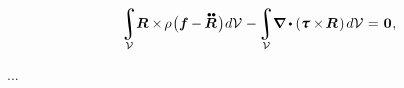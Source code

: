 \begin{otherlanguage}{russian}
\nopagebreak\vspace{-0.2em}\begin{equation*}
\integral\displaylimits_{\mathcal{V}} \hspace{-0.5ex} \bm{R} \times \hspace{-0.2ex} \rho \hspace{.15ex} \bigl( \bm{f} \hspace{-0.1ex} - \hspace{-0.1ex} \mathdotdotabove{\bm{R}} \hspace{.2ex} \bigr) \hspace{.1ex} d\mathcal{V} \hspace{.12ex}
- \hspace{-0.2ex} \integral\displaylimits_{\mathcal{V}} \hspace{-0.5ex} \boldnabla \dotp \left( \cauchystress \times \hspace{-0.24ex} \bm{R} \hspace{.2ex} \right) \hspace{-0.1ex} d\mathcal{V} \hspace{.1ex}
= \hspace{.15ex} \bm{0} \hspace{.1ex} ,
\end{equation*}

...


\end{otherlanguage}
